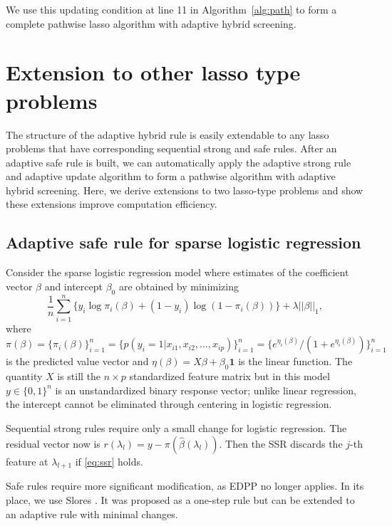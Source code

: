 We use this updating condition at line 11 in Algorithm~\ref{alg:path} to form a complete pathwise lasso algorithm with adaptive hybrid screening. 

\section{Extension to other lasso type problems}
\label{sec:extension}

The structure of the adaptive hybrid rule is easily extendable to any lasso problems that have corresponding sequential strong and safe rules. After an adaptive safe rule is built, we can automatically apply the adaptive strong rule and adaptive update algorithm to form a pathwise algorithm with adaptive hybrid screening. Here, we derive extensions to two lasso-type problems and show these extensions improve computation efficiency.

\subsection{Adaptive safe rule for sparse logistic regression}
\label{sec:logis}

Consider the sparse logistic regression model where estimates of the coefficient vector $\beta$ and intercept $\beta_0$ are obtained by minimizing
\begin{equation}
    \label{eq:logis}
  \frac{1}{n} \sum_{i=1}^n \big\{y_i\log\pi_i(\beta) + (1-y_i)\log(1 -\pi_i(\beta))\big\} + \lambda||\beta||_1,
\end{equation}
where $\pi(\beta)=\{\pi_i(\beta)\}_{i=1}^n=\{p(y_i=1|x_{i1},x_{i2},...,x_{ip})\}_{i=1}^n=\{e^{\eta_i(\beta)}/(1+e^{\eta_i(\beta)})\}_{i=1}^n$ is the predicted value vector and $\eta(\beta)=X\beta+\beta_0\mathbf{1}$ is the linear function. The quantity $X$ is still the $n\times p$ standardized feature matrix but in this model $y\in\{0,1\}^n$ is an unstandardized binary response vector; unlike linear regression, the intercept cannot be eliminated through centering in logistic regression.

Sequential strong rules require only a small change for logistic regression. The residual vector now is $r(\lambda_l)=y-\pi(\hat{\beta}(\lambda_l))$. Then the SSR discards the $j$-th feature at $\lambda_{l+1}$ if \eqref{eq:ssr} holds.

Safe rules require more significant modification, as EDPP no longer applies. In its place, we use Slores \citep[sparse logistic regression screening rule,][]{wang2014safe}. It was proposed as a one-step rule but can be extended to an adaptive rule with minimal changes. 

